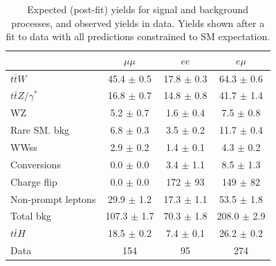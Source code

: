 \begin{table}[htbp]
  \begin{center}
    \caption[Signal region post-fit event yields by lepton flavor]{Expected (post-fit) yields for signal and background processes, and observed yields in data. Yields
      shown after a fit to data with all predictions constrained to SM expectation.}
    \begin{tabular}{l c c c} \hline
      & $\mu\mu$ & $ee$ & $e\mu$  \\ \hline 
      $t\bar{t}W$ & 45.4 $\pm$ 0.5 & 17.8 $\pm$ 0.3 & 64.3 $\pm$ 0.6 \\
      $t\bar{t}Z/\gamma^{*}$ & 16.8 $\pm$ 0.7 & 14.8 $\pm$ 0.8 & 41.7 $\pm$ 1.4 \\
      \hline
      WZ & 5.2 $\pm$ 0.7 & 1.6 $\pm$ 0.4 & 7.5 $\pm$ 0.8 \\
      Rare SM. bkg & 6.8 $\pm$ 0.3 & 3.5 $\pm$ 0.2 & 11.7 $\pm$ 0.4 \\
      WWss & 2.9 $\pm$ 0.2 & 1.4 $\pm$ 0.1 & 4.3 $\pm$ 0.2 \\
      \hline
      Conversions & 0.0 $\pm$ 0.0 & 3.4 $\pm$ 1.1 & 8.5 $\pm$ 1.3 \\
      Charge flip & 0.0 $\pm$ 0.0 & 172 $\pm$ 93 & 149 $\pm$ 82 \\
      Non-prompt leptons & 29.9 $\pm$ 1.2 & 17.3 $\pm$ 1.1 & 53.5 $\pm$ 1.8 \\
      \hline
      Total bkg & 107.3 $\pm$ 1.7 & 70.3 $\pm$ 1.8 & 208.0 $\pm$ 2.9 \\
      \hline
      $t\bar{t}H$ & 18.5 $\pm$ 0.2 & 7.4 $\pm$ 0.1 & 26.2 $\pm$ 0.2 \\
      \hline
      Data & 154 & 95 & 274 \\
      \hline
    \end{tabular}
    \label{tab:yields}
  \end{center}
\end{table}


